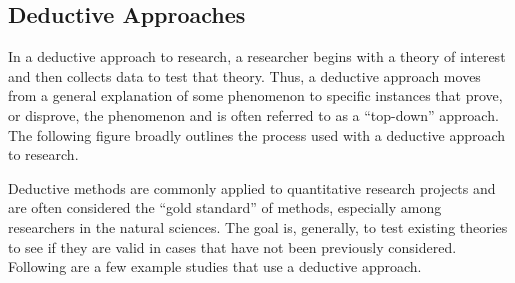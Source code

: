 \documentclass[]{book}
\theoremstyle{definition}
\theoremstyle{definition}
\theoremstyle{definition}
\theoremstyle{remark}
\begin{document}
\hypertarget{deductive-approaches}{%
\subsection{Deductive Approaches}\label{deductive-approaches}}

In a deductive approach to research, a researcher begins with a theory
of interest and then collects data to test that theory. Thus, a
deductive approach moves from a general explanation of some phenomenon
to specific instances that prove, or disprove, the phenomenon and is
often referred to as a ``top-down'' approach. The following figure
broadly outlines the process used with a deductive approach to research.

Deductive methods are commonly applied to quantitative research projects
and are often considered the ``gold standard'' of methods, especially
among researchers in the natural sciences. The goal is, generally, to
test existing theories to see if they are valid in cases that have not
been previously considered. Following are a few example studies that use
a deductive approach.
\end{document}
